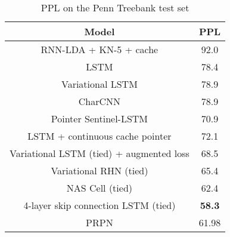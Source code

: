 \documentclass{article}
\begin{document}
\begin{table}[h!]                                                                 
\centering                                                                       
  \begin{tabular}{ c c }                                                         
    \toprule[2pt]                                                                
    Model & PPL \\                                                               
    \hline                                                                       
    RNN-LDA + KN-5 + cache \citep{mikolov2012context} &  92.0 \\                 
    LSTM \citep{zaremba2014recurrent} & 78.4 \\                                  
    Variational LSTM \citep{kim2016character} & 78.9 \\                          
    CharCNN \citep{kim2016character} & 78.9 \\                                   
    Pointer Sentinel-LSTM \citep{merity2016pointer} & 70.9 \\                    
    LSTM + continuous cache pointer \citep{grave2016improving} & 72.1 \\         
    Variational LSTM (tied) + augmented loss \citep{inan2016tying} & 68.5 \\     
    Variational RHN (tied) \citep{zilly2016recurrent} & 65.4 \\                  
    NAS Cell (tied)  \citep{zoph2016neural} & 62.4 \\                            
    4-layer skip connection LSTM (tied) \citep{melis2017state} & \textbf{58.3} \\
    \hline                                                                       
    PRPN & 61.98 \\                                                              
    \toprule[2pt]                                                                
  \end{tabular}                                                                  
  \caption{PPL on the Penn Treebank test set}                                    
  \label{tab_ptb_word}                                                           
\end{table}                                                                      
\end{document}
